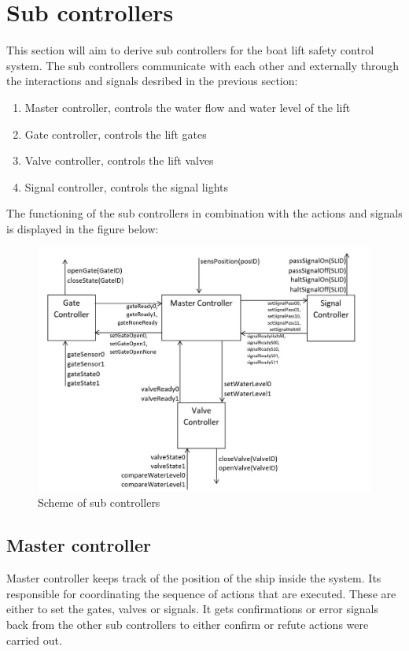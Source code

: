 \section{Sub controllers}
This section will aim to derive sub controllers for the boat lift safety control system. The sub controllers communicate with each other and externally through the interactions and signals desribed in the previous section:

\begin{enumerate}
	\item Master controller, controls the water flow and water level of the lift
	\item Gate controller, controls the lift gates
	\item Valve controller, controls the lift valves
	\item Signal controller, controls the signal lights
\end{enumerate}

\noindent The functioning of the sub controllers in combination with the actions and signals is displayed in the figure below:

\begin{figure}[!h]
	\includegraphics[width=\linewidth]{controllers}
	\caption{Scheme of sub controllers}
	\label{fig:subcontrollers}
\end{figure}
\subsection{Master controller}
Master controller keeps track of the position of the ship inside the system. Its responsible for coordinating the sequence of actions that are executed. These are either to set the gates, valves or signals. It gets confirmations or error signals back from the other sub controllers to either confirm or refute actions were carried out. \\

